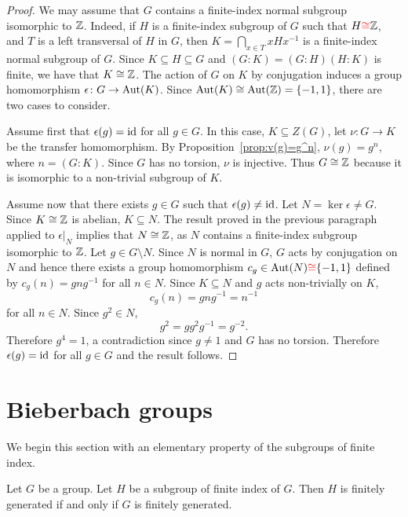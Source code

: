 \begin{proof}
	We may assume that $G$ contains a finite-index normal subgroup isomorphic to $\mathbb{Z}$. Indeed, 
	if $H$ is a finite-index subgroup of $G$ such that $H\textcolor{red}{\cong}\mathbb{Z}$, and $T$ is a left transversal of $H$ in $G$, then 
	$K=\bigcap_{x\in T}xHx^{-1}$ is a finite-index normal subgroup of $G$. Since $K\subseteq H\subseteq G$  and $(G:K)=(G:H)(H:K)$ is finite, we have that $K\cong\mathbb{Z}$.
	The action of $G$ on $K$ by conjugation induces a group homomorphism  
	$\epsilon\colon G\to\operatorname{Aut}(K)$. Since $\operatorname{Aut}(K)\cong\operatorname{Aut}(\mathbb{Z})=\{-1,1\}$, 
	there are two cases to consider.
	
	Assume first that $\epsilon(g)=\operatorname{id}$ for all $g\in G$. In this case, $K\subseteq Z(G)$, let
	$\nu\colon G\to K$ be the transfer homomorphism. By
	Proposition~\ref{prop:v(g)=g^n}, $\nu(g)=g^n$, where $n=(G:K)$. Since
	$G$ has no torsion, $\nu$ is injective. Thus
	$G\cong\mathbb{Z}$ because it is isomorphic to a non-trivial subgroup of $K$.

	Assume now that there exists $g\in G$ such that $\epsilon(g)\ne\operatorname{id}$. Let $N=\ker\epsilon\ne G$. Since
	$K\cong\mathbb{Z}$ is abelian, $K\subseteq N$. The result proved in the previous paragraph 
	applied to $\epsilon|_N$ implies that $N\cong\mathbb{Z}$, as 
	$N$ contains a finite-index subgroup isomorphic to $\mathbb{Z}$. Let $g\in G\setminus N$. 
	Since $N$ is normal in $G$, $G$ acts by conjugation on $N$ and hence 
	there exists a group homomorphism $c_g\in\operatorname{Aut}(N)\textcolor{red}{\cong}\{-1,1\}$ defined by $c_g(n)=gng^{-1}$ for all $n\in N$. Since
	$K\subseteq N$ and $g$ acts non-trivially on $K$, 
	\[
	c_g(n)=gng^{-1}=n^{-1}
	\]
	for all $n\in N$.  Since 
	$g^2\in N$, 
	\[
		g^2=gg^2g^{-1}=g^{-2}.
	\]
	Therefore $g^4=1$, a contradiction since $g\ne1$ and $G$ has no torsion. Therefore $\epsilon(g)=\operatorname{id}$ for all $g\in G$ and the result follows.
\end{proof}

\section{Bieberbach groups}

We begin this section with an elementary property of the subgroups of finite index. 

\begin{lemma} \label{lem:fgfisubgroup}
Let $G$ be a group.  Let $H$ be a subgroup of finite index of $G$. Then $H$ is finitely generated if and only if $G$ is finitely generated.
\end{lemma}

